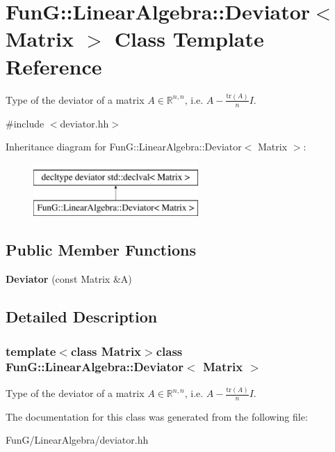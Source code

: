 \hypertarget{classFunG_1_1LinearAlgebra_1_1Deviator}{\section{Fun\-G\-:\-:Linear\-Algebra\-:\-:Deviator$<$ Matrix $>$ Class Template Reference}
\label{classFunG_1_1LinearAlgebra_1_1Deviator}
}


Type of the deviator of a matrix $ A\in\mathbb{R}^{n,n} $, i.\-e. $ A - \frac{\mathrm{tr}(A)}{n}I $.  




{\ttfamily \#include $<$deviator.\-hh$>$}

Inheritance diagram for Fun\-G\-:\-:Linear\-Algebra\-:\-:Deviator$<$ Matrix $>$\-:\begin{figure}[H]
\begin{center}
\leavevmode
\includegraphics[height=2.000000cm]{classFunG_1_1LinearAlgebra_1_1Deviator}
\end{center}
\end{figure}
\subsection*{Public Member Functions}
\begin{DoxyCompactItemize}
\item 
\hypertarget{classFunG_1_1LinearAlgebra_1_1Deviator_a5baa30ab51f9b03563378bf288d8f648}{{\bfseries Deviator} (const Matrix \&A)}\label{classFunG_1_1LinearAlgebra_1_1Deviator_a5baa30ab51f9b03563378bf288d8f648}

\end{DoxyCompactItemize}


\subsection{Detailed Description}
\subsubsection*{template$<$class Matrix$>$class Fun\-G\-::\-Linear\-Algebra\-::\-Deviator$<$ Matrix $>$}

Type of the deviator of a matrix $ A\in\mathbb{R}^{n,n} $, i.\-e. $ A - \frac{\mathrm{tr}(A)}{n}I $. 

The documentation for this class was generated from the following file\-:\begin{DoxyCompactItemize}
\item 
Fun\-G/\-Linear\-Algebra/deviator.\-hh\end{DoxyCompactItemize}
